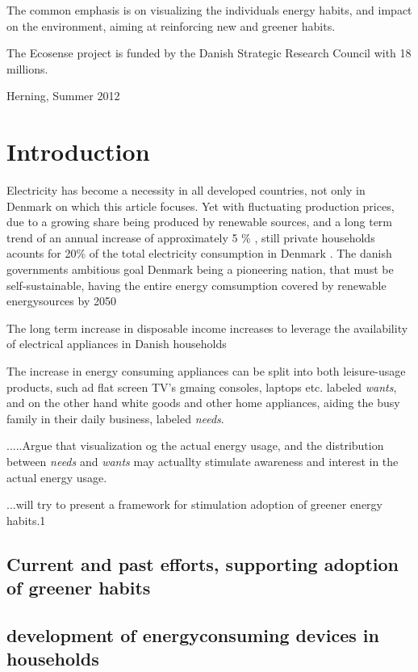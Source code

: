 \documentclass[journal]{IEEEtran}
\begin{document}
The common emphasis is on visualizing the individuals energy habits, and impact on the environment, aiming at reinforcing new and greener habits. 

The Ecosense project is funded by the Danish Strategic Research Council with 18 millions.
 
\hfill Herning, Summer 2012

\section{Introduction}
Electricity has become a necessity in all developed countries, not only in Denmark on which this article focuses. Yet with fluctuating production prices, due to a growing share being produced by renewable sources, and a long term trend of an annual increase of approximately 5 \% \cite{udv_elpriser}, still private households acounts for 20\% of the total electricity consumption in Denmark \cite{energistat}.
The danish governments ambitious goal Denmark being a pioneering nation, that must be self-sustainable, having the entire energy comsumption covered by renewable energysources by 2050 \cite{energipolitik_2020} 

The long term increase in disposable income increases to leverage the availability of electrical appliances in Danish households %

The increase in energy consuming appliances can be split into both leisure-usage products, such ad flat screen TV's gmaing consoles, laptops etc. labeled \textit{wants}, and on the other hand white goods and other home appliances, aiding the busy family in their daily business, labeled \textit{needs}.

.....Argue that visualization og the actual energy usage, and the distribution between \textit{needs} and \textit{wants} may actuallty stimulate awareness and interest in the actual energy usage.

...will try to present a framework for stimulation adoption of greener energy habits.1




\subsection{Current and past efforts, supporting adoption of greener habits}

\subsection{development of energyconsuming devices in households}
\end{document}
